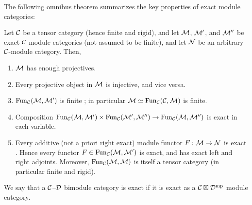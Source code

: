 \documentclass{amsart}
\begin{document}
The following omnibus theorem summarizes the key properties of exact module categories: 
\begin{theorem} \label{Thm:ExactModCatOmnibus}
	Let $\mathcal C$ be a tensor category (hence finite and rigid), and let $\mathcal M$, $\mathcal M'$, and $\mathcal M''$ be exact $\mathcal C$-module categories (not assumed to be finite), and let $\mathcal N$ be an arbitrary $\mathcal C$-module category. Then,
	\begin{enumerate}
		\item $\mathcal M$ has enough projectives. \cite[Lemma 2.7.1]{EGNO}
		\item Every projective object in $\mathcal M$  is injective, and vice versa. \cite[Cor 2.7.4]{EGNO}
		\item $\operatorname{Fun}_{\mathcal C}(\mathcal M, \mathcal M')$ is finite \cite[Prop 2.13.5]{EGNO}; in particular $\mathcal M \simeq \operatorname{Fun}_{\mathcal C}(\mathcal C, \mathcal M)$ is finite.
		\item Composition $\operatorname{Fun}_{\mathcal C}(\mathcal M, \mathcal M') \times \operatorname{Fun}_{\mathcal C}(\mathcal M', \mathcal M'') \to \operatorname{Fun}_{\mathcal C}(\mathcal M, \mathcal M'')$ is exact in each variable. \cite[Lemma 2.13.2]{EGNO}		
		\item Every additive (not a priori right exact) module functor $F:\mathcal M \to \mathcal N$ is exact \cite[Prop 2.7.8]{EGNO}. Hence every functor $F \in \operatorname{Fun}_{\mathcal C}(\mathcal M, \mathcal M')$ is exact, and has exact left and right adjoints. Moreover, $\operatorname{Fun}_{\mathcal C}(\mathcal M,\mathcal M)$ is itself a tensor category (in particular finite and rigid). 
	\end{enumerate}
\end{theorem}

\begin{definition}
We say that a $\mathcal C$--$\mathcal D$ bimodule category is exact if it is exact as a $\mathcal C \boxtimes \mathcal D^{\mathrm{mp}}$ module category.
\end{definition}
\end{document}
